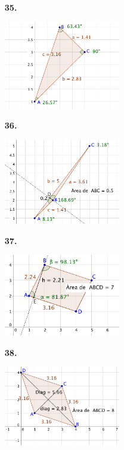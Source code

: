 \documentclass[a4paper, pdf, twoside]{book}
\begin{document}
\begin{multicols}{2}
\begin{enumerate}
\vspace{0.25cm}
\item[\fontfamily{phv}\selectfont\color{blue}\textbf{35. }] 
\mbox {}\par \includegraphics [width=0.4\textwidth ]{img-sol/t8-31}
\vspace{0.25cm}
\item[\fontfamily{phv}\selectfont\color{blue}\textbf{36. }] 
\mbox {}\par \includegraphics [width=0.4\textwidth ]{img-sol/t8-32}
\vspace{0.25cm}
\item[\fontfamily{phv}\selectfont\color{blue}\textbf{37. }] 
\mbox {}\par \includegraphics [width=0.4\textwidth ]{img-sol/t8-33}
\vspace{0.25cm}
\item[\fontfamily{phv}\selectfont\color{blue}\textbf{38. }] 
\mbox {}\par \includegraphics [width=0.4\textwidth ]{img-sol/t8-34}

\end{enumerate}
\end{multicols}
\end{document}
